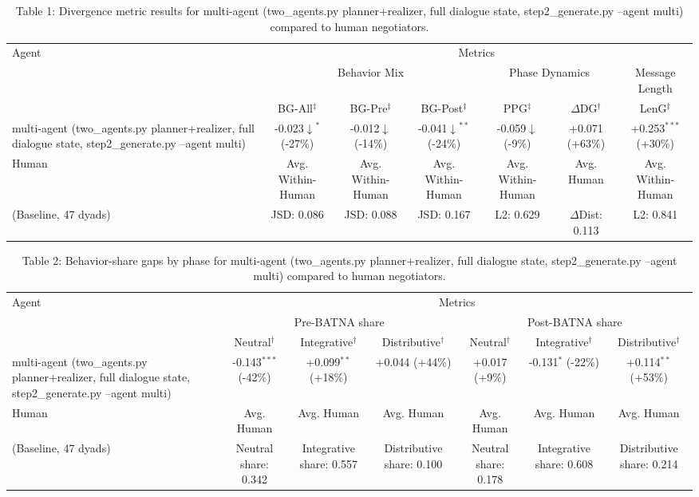 \begin{table}[t]
\centering
\begin{tabular}{lcccccc}
\toprule
\multirow{3}{*}{Agent} & \multicolumn{6}{c}{Metrics} \\
\cmidrule(lr){2-7}
 & \multicolumn{3}{c}{Behavior Mix} & \multicolumn{2}{c}{Phase Dynamics} & \multicolumn{1}{c}{Message Length} \\
\cmidrule(lr){2-4} \cmidrule(lr){5-6} \cmidrule(lr){7-7}
 & BG-All$^\ddagger$ & BG-Pre$^\ddagger$ & BG-Post$^\ddagger$ & PPG$^\ddagger$ & $\Delta$DG$^\dagger$ & LenG$^\ddagger$ \\
\midrule
multi-agent (two_agents.py planner+realizer, full dialogue state, step2_generate.py --agent multi) & -0.023$\downarrow$$^{*}$ (-27\%) & -0.012$\downarrow$ (-14\%) & -0.041$\downarrow$$^{**}$ (-24\%) & -0.059$\downarrow$ (-9\%) & +0.071 (+63\%) & +0.253$^{***}$ (+30\%) \\
\midrule
Human & Avg. Within-Human & Avg. Within-Human & Avg. Within-Human & Avg. Within-Human & Avg. Human & Avg. Within-Human \\
(Baseline, 47 dyads) & JSD: 0.086 & JSD: 0.088 & JSD: 0.167 & L2: 0.629 & $\Delta$Dist: 0.113 & L2: 0.841 \\
\bottomrule
\end{tabular}
\caption{Table 1: Divergence metric results for multi-agent (two_agents.py planner+realizer, full dialogue state, step2_generate.py --agent multi) compared to human negotiators.}
\end{table}

\begin{table}[t]
\centering
\begin{tabular}{lcccccc}
\toprule
\multirow{3}{*}{Agent} & \multicolumn{6}{c}{Metrics} \\
\cmidrule(lr){2-7}
 & \multicolumn{3}{c}{Pre-BATNA share} & \multicolumn{3}{c}{Post-BATNA share} \\
\cmidrule(lr){2-4} \cmidrule(lr){5-7}
 & Neutral$^\dagger$ & Integrative$^\dagger$ & Distributive$^\dagger$ & Neutral$^\dagger$ & Integrative$^\dagger$ & Distributive$^\dagger$ \\
\midrule
multi-agent (two_agents.py planner+realizer, full dialogue state, step2_generate.py --agent multi) & -0.143$^{***}$ (-42\%) & +0.099$^{**}$ (+18\%) & +0.044 (+44\%) & +0.017 (+9\%) & -0.131$^{*}$ (-22\%) & +0.114$^{**}$ (+53\%) \\
\midrule
Human & Avg. Human & Avg. Human & Avg. Human & Avg. Human & Avg. Human & Avg. Human \\
(Baseline, 47 dyads) & Neutral share: 0.342 & Integrative share: 0.557 & Distributive share: 0.100 & Neutral share: 0.178 & Integrative share: 0.608 & Distributive share: 0.214 \\
\bottomrule
\end{tabular}
\caption{Table 2: Behavior-share gaps by phase for multi-agent (two_agents.py planner+realizer, full dialogue state, step2_generate.py --agent multi) compared to human negotiators.}
\end{table}
